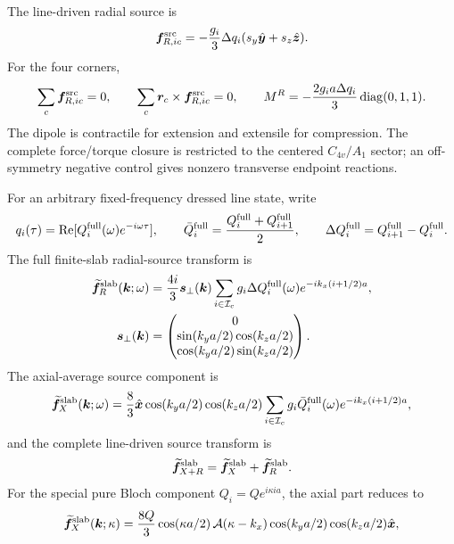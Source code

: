 \documentclass[10pt,aps,pre,onecolumn,notitlepage,nofootinbib]{revtex4-2}
\newcommand{\vk}{\bm k}
\newcommand{\vf}{\bm f}
\begin{document}
The line-driven radial source is
\begin{equation}
 \vf^{\rm src}_{R,ic}=-\frac{g_i}{3}\Delta q_i(s_y\hat{\bm y}+s_z\hat{\bm z}).
\end{equation}
For the four corners,
\begin{equation}
 \sum_c\vf^{\rm src}_{R,ic}=0,
 \qquad
 \sum_c\bm r_c\times\vf^{\rm src}_{R,ic}=0,
 \qquad
 M^R=-\frac{2g_i a\Delta q_i}{3}\operatorname{diag}(0,1,1).
\end{equation}
The dipole is contractile for extension and extensile for compression.  The complete force/torque closure is restricted to the centered $C_{4v}/A_1$ sector; an off-symmetry negative control gives nonzero transverse endpoint reactions.

For an arbitrary fixed-frequency dressed line state, write
\begin{equation}
 q_i(\tau)=\operatorname{Re}[Q_i^{\rm full}(\omega)e^{-i\omega\tau}],
 \qquad
 \bar Q_i^{\rm full}=\frac{Q_i^{\rm full}+Q_{i+1}^{\rm full}}{2},
 \qquad
 \Delta Q_i^{\rm full}=Q_{i+1}^{\rm full}-Q_i^{\rm full}.
\end{equation}
The full finite-slab radial-source transform is
\begin{align}
 \widetilde{\vf}^{\rm slab}_{R}(\vk;\omega)
 &=\frac{4i}{3}\bm s_\perp(\vk)
 \sum_{i\in\mathcal I_c}g_i\Delta Q_i^{\rm full}(\omega)
 e^{-ik_x(i+1/2)a},\\
 \bm s_\perp(\vk)&=
 \begin{pmatrix}
 0\\ \sin(k_ya/2)\cos(k_za/2)\\
 \cos(k_ya/2)\sin(k_za/2)
 \end{pmatrix}.
\end{align}
The axial-average source component is
\begin{equation}
 \widetilde{\vf}^{\rm slab}_{X}(\vk;\omega)
 =\frac{8}{3}\hat{\bm x}
 \cos(k_ya/2)\cos(k_za/2)
 \sum_{i\in\mathcal I_c}g_i\bar Q_i^{\rm full}(\omega)
 e^{-ik_x(i+1/2)a},
\end{equation}
and the complete line-driven source transform is
\begin{equation}
 \widetilde{\vf}^{\rm slab}_{X+R}
 =\widetilde{\vf}^{\rm slab}_{X}
 +\widetilde{\vf}^{\rm slab}_{R}.
\end{equation}
For the special pure Bloch component $Q_i=Qe^{i\kappa ia}$, the axial part reduces to
\begin{equation}
 \widetilde{\vf}^{\rm slab}_{X}(\vk;\kappa)
 =\frac{8Q}{3}\cos(\kappa a/2)\,
 \mathcal A(\kappa-k_x)
 \cos(k_ya/2)\cos(k_za/2)\hat{\bm x},
\end{equation}
\end{document}
